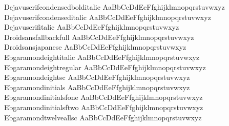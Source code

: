 \begin{tabbing}
Dejavuserifcondensedbolditalic \> { AaBbCcDdEeFfghijklmnopqrstuvwxyz} \\
Dejavuserifcondenseditalic \> { AaBbCcDdEeFfghijklmnopqrstuvwxyz} \\
Dejavuserifitalic \> { AaBbCcDdEeFfghijklmnopqrstuvwxyz} \\
Droidsansfallbackfull \> { AaBbCcDdEeFfghijklmnopqrstuvwxyz} \\
Droidsansjapanese \> { AaBbCcDdEeFfghijklmnopqrstuvwxyz} \\
Ebgaramondeightitalic \> { AaBbCcDdEeFfghijklmnopqrstuvwxyz} \\
Ebgaramondeightregular \> { AaBbCcDdEeFfghijklmnopqrstuvwxyz} \\
Ebgaramondeightsc \> { AaBbCcDdEeFfghijklmnopqrstuvwxyz} \\
Ebgaramondinitials \> { AaBbCcDdEeFfghijklmnopqrstuvwxyz} \\
Ebgaramondinitialsfone \> { AaBbCcDdEeFfghijklmnopqrstuvwxyz} \\
Ebgaramondinitialsftwo \> { AaBbCcDdEeFfghijklmnopqrstuvwxyz} \\
Ebgaramondtwelveallsc \> { AaBbCcDdEeFfghijklmnopqrstuvwxyz} \\

\end{tabbing}
